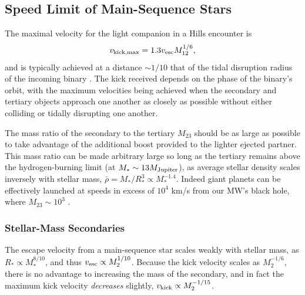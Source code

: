 \documentclass[a4paper,twocolumn]{emulateapj}
\begin{document}
\subsection{Speed Limit of Main-Sequence Stars}
The maximal velocity for the light companion in a Hills encounter is
\begin{equation}
v_{\rm kick,\max} = 1.3 v_{\rm esc} M_{12}^{1/6}\label{eq:vkickmax},
\end{equation}
and is typically achieved at a distance $\sim 1/10$ that of the tidal disruption radius of the incoming binary \citep{Sari:2010de}. The kick received depends on the phase of the binary's orbit, with the maximum velocities being achieved when the secondary and tertiary objects approach one another as closely as possible without either colliding or tidally disrupting one another.

The mass ratio of the secondary to the tertiary $M_{23}$ should be as large as possible to take advantage of the additional boost provided to the lighter ejected partner. This mass ratio can be made arbitrary large so long as the tertiary remains above the hydrogen-burning limit (at $M_{\ast} \sim 13 M_{\rm Jupiter}$), as average stellar density scales inversely with stellar mass, $\bar{\rho} = M_\ast / R_\ast^3 \propto M_\ast^{-1.4}$. Indeed giant planets can be effectively launched at speeds in excess of $10^{4}$ km/s from our MW's black hole, where $M_{23} \sim 10^{3}$ \citep{Ginsburg:2012cr}.

\subsubsection{Stellar-Mass Secondaries}
The escape velocity from a main-sequence star scales weakly with stellar mass, as $R_\ast \propto M_\ast^{8/10}$, and thus $v_{\rm esc} \propto M_2^{1/10}$. Because the kick velocity scales as $M_2^{-1/6}$, there is no advantage to increasing the mass of the secondary, and in fact the maximum kick velocity {\it decreases} slightly, $v_{\rm kick} \propto M_2^{-1/15}$.
\end{document}

